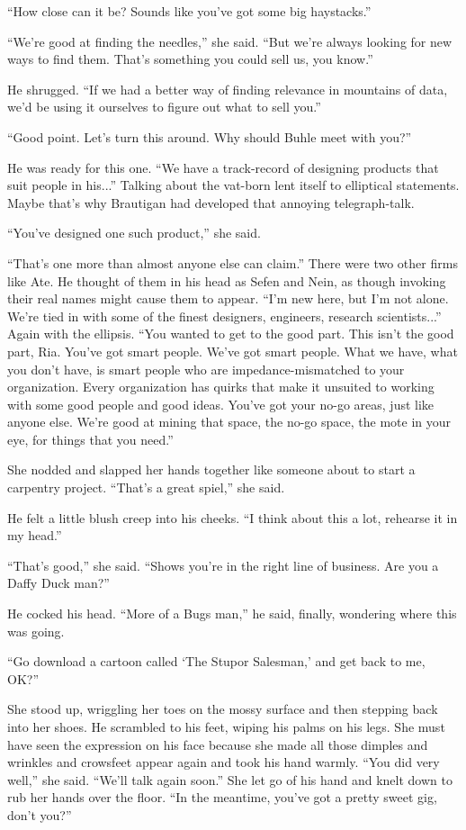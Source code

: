 “How close can it be? Sounds like you've got some big haystacks.”

“We're good at finding the needles,” she said. “But we're always 
looking for new ways to find them. That's something you could sell us, 
you know.”

He shrugged. “If we had a better way of finding relevance in 
mountains of data, we'd be using it ourselves to figure out what to 
sell you.”

“Good point. Let's turn this around. Why should Buhle meet with 
you?”

He was ready for this one. “We have a track-record of designing 
products that suit people in his...” Talking about the vat-born lent 
itself to elliptical statements. Maybe that's why Brautigan had 
developed that annoying telegraph-talk.

“You've designed one such product,” she said.

“That's one more than almost anyone else can claim.” There were two 
other firms like Ate. He thought of them in his head as Sefen and Nein, 
as though invoking their real names might cause them to appear. “I'm 
new here, but I'm not alone. We're tied in with some of the finest 
designers, engineers, research scientists...” Again with the 
ellipsis. “You wanted to get to the good part. This isn't the good 
part, Ria. You've got smart people. We've got smart people. What we 
have, what you don't have, is smart people who are impedance-mismatched 
to your organization. Every organization has quirks that make it 
unsuited to working with some good people and good ideas. You've got 
your no-go areas, just like anyone else. We're good at mining that 
space, the no-go space, the mote in your eye, for things that you 
need.”

She nodded and slapped her hands together like someone about to start a 
carpentry project. “That's a great spiel,” she said.

He felt a little blush creep into his cheeks. “I think about this a 
lot, rehearse it in my head.”

“That's good,” she said. “Shows you're in the right line of 
business. Are you a Daffy Duck man?”

He cocked his head. “More of a Bugs man,” he said, finally, 
wondering where this was going.

“Go download a cartoon called `The Stupor Salesman,' and get back to 
me, OK?”

She stood up, wriggling her toes on the mossy surface and then stepping 
back into her shoes. He scrambled to his feet, wiping his palms on his 
legs. She must have seen the expression on his face because she made 
all those dimples and wrinkles and crowsfeet appear again and took his 
hand warmly. “You did very well,” she said. “We'll talk again 
soon.” She let go of his hand and knelt down to rub her hands over 
the floor. “In the meantime, you've got a pretty sweet gig, don't 
you?”

